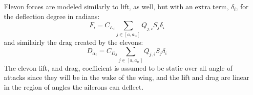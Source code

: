 Elevon forces are modeled similarly to lift, as well, but with an extra term, $\delta_i$, for the deflection degree in radians:
\begin{equation}
    F_i = C_{L_\delta} \sum_{j \in [a, a_w]}  Q_{j,i} S_j \delta_i
\end{equation}
and similairly the drag created by the elevons:
\begin{equation}
    D_{\alpha_i} = C_{D_\delta} \sum_{j \in [a, a_w]}  Q_{j,i} S_j \delta_i
\end{equation}
The elevon lift, and drag, coefficient is assumed to be static over all angle of attacks since they will be in the wake of the wing, and the lift and drag are linear in the region of angles the ailerons can deflect.
